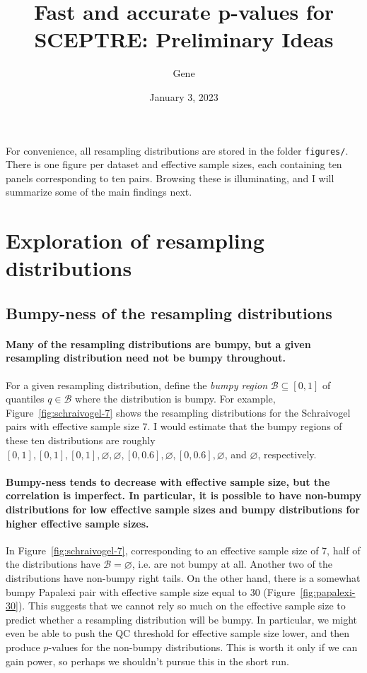 \documentclass[12pt]{article}
\begin{document}
\title{Fast and accurate p-values for SCEPTRE: Preliminary Ideas}
\author{Gene}
\date{January 3, 2023}

\maketitle
\thispagestyle{empty}

For convenience, all resampling distributions are stored in the folder \verb|figures/|. There is one figure per dataset and effective sample sizes, each containing ten panels corresponding to ten pairs. Browsing these is illuminating, and I will summarize some of the main findings next. 

\section[Exploration]{Exploration of resampling distributions}

\subsection{Bumpy-ness of the resampling distributions}

\paragraph{Many of the resampling distributions are bumpy, but a given resampling distribution need not be bumpy throughout.} For a given resampling distribution, define the \textit{bumpy region} $\mathcal B \subseteq [0,1]$ of quantiles $q \in \mathcal B$ where the distribution is bumpy. For example, Figure~\ref{fig:schraivogel-7}  shows the resampling distributions for the Schraivogel pairs with effective sample size 7. I would estimate that the bumpy regions of these ten distributions are roughly $[0,1], [0,1], [0,1], \varnothing, \varnothing, [0, 0.6], \varnothing, [0, 0.6], \varnothing$, and $\varnothing$, respectively.

\paragraph{Bumpy-ness tends to decrease with effective sample size, but the correlation is imperfect. In particular, it is possible to have non-bumpy distributions for low effective sample sizes and bumpy distributions for higher effective sample sizes.} In Figure~\ref{fig:schraivogel-7}, corresponding to an effective sample size of 7, half of the distributions have $\mathcal B = \varnothing$, i.e. are not bumpy at all. Another two of the distributions have non-bumpy right tails. On the other hand, there is a somewhat bumpy Papalexi pair with effective sample size equal to 30 (Figure~\ref{fig:papalexi-30}). This suggests that we cannot rely so much on the effective sample size to predict whether a resampling distribution will be bumpy. In particular, we might even be able to push the QC threshold for effective sample size lower, and then produce $p$-values for the non-bumpy distributions. This is worth it only if we can gain power, so perhaps we shouldn't pursue this in the short run.
\end{document}
